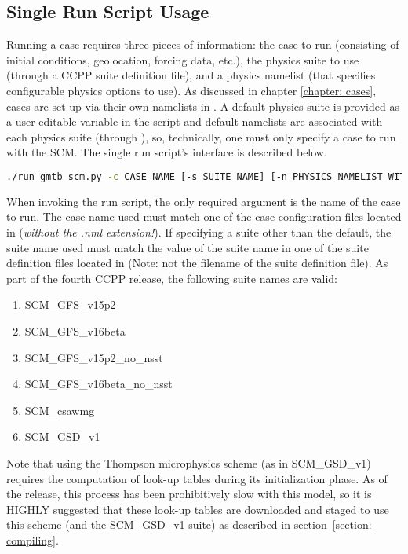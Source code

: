\subsection{Single Run Script Usage} \label{subsection: singlerunscript}
Running a case requires three pieces of information: the case to run (consisting of initial conditions, geolocation, forcing data, etc.), the physics suite to use (through a CCPP suite definition file), and a physics namelist (that specifies configurable physics options to use). As discussed in chapter \ref{chapter: cases}, cases are set up via their own namelists in . A default physics suite is provided as a user-editable variable in the script and default namelists are associated with each physics suite (through ), so, technically, one must only specify a case to run with the SCM. The single run script's interface is described below.

\begin{lstlisting}[language=bash]
./run_gmtb_scm.py -c CASE_NAME [-s SUITE_NAME] [-n PHYSICS_NAMELIST_WITH_PATH] [-g] [-d]
\end{lstlisting}

When invoking the run script, the only required argument is the name of the case to run. The case name used must match one of the case configuration files located in  (\emph{without the .nml extension!}). If specifying a suite other than the default, the suite name used must match the value of the suite name in one of the suite definition files located in  (Note: not the filename of the suite definition file). As part of the fourth CCPP release, the following suite names are valid:
\begin{enumerate}
\item SCM\_GFS\_v15p2
\item SCM\_GFS\_v16beta
\item SCM\_GFS\_v15p2\_no\_nsst
\item SCM\_GFS\_v16beta\_no\_nsst
\item SCM\_csawmg
\item SCM\_GSD\_v1
\end{enumerate}

Note that using the Thompson microphysics scheme (as in SCM\_GSD\_v1) requires the computation of look-up tables during its initialization phase. As of the release, this process has been prohibitively slow with this model, so it is HIGHLY suggested that these look-up tables are downloaded and staged to use this scheme (and the SCM\_GSD\_v1 suite) as described in section~\ref{section: compiling}.

